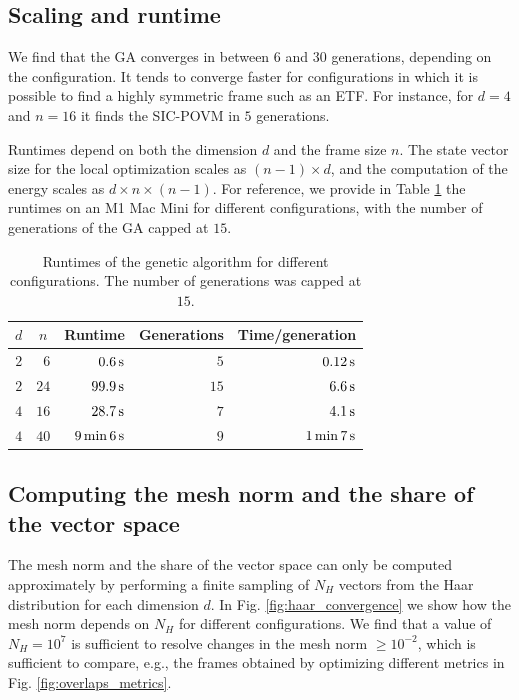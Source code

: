 \documentclass[%
superscriptaddress,
amsmath,amssymb,
 aps,
pra,
floatfix,
]{revtex4-2}
\begin{document}
\subsection{Scaling and runtime}
We find that the GA converges in between $6$ and $30$ generations, depending on the configuration. It tends to converge faster for configurations in which it is possible to find a highly symmetric frame such as an ETF. For instance, for $d=4$ and $n=16$ it finds the SIC-POVM in $5$ generations. 

Runtimes depend on both the dimension $d$ and the frame size $n$. The state vector size for the local optimization scales as $(n-1) \times d$, and the computation of the energy scales as $d \times n \times (n-1)$. For reference, we provide in Table \ref{tab:runtimes} the runtimes on an M1 Mac Mini for different configurations, with the number of generations of the GA capped at $15$.
\begin{table}[]
\begin{tabular}{@{}rrrrr@{}}
\toprule
\multicolumn{1}{c}{$d$} & \multicolumn{1}{c}{$n$} & \multicolumn{1}{c}{Runtime}   & \multicolumn{1}{c}{Generations} & \multicolumn{1}{c}{Time/generation} \\ \midrule
$2$                     & $6$                     & $0.6 \, {\rm s}$              & $5$                                               & $0.12 \, {\rm s}$                   \\
$2$                     & $24$                    & $99.9 \, {\rm s}$             & $15$                                              & $6.6 \, {\rm s}$                    \\
$4$                     & $16$                    & $28.7 \, {\rm s}$             & $7$                                               & $4.1 \, {\rm s}$                    \\
$4$                     & $40$                    & $9 \, {\rm min} \, 6 \, {\rm s}$ & $9$                                               & $1 \, {\rm min} \, 7 \, {\rm s}$       \\ \bottomrule
\end{tabular}
\label{tab:runtimes}
\caption{Runtimes of the genetic algorithm for different configurations. The number of generations was capped at $15$.}
\end{table}

\subsection{Computing the mesh norm and the share of the vector space}
The mesh norm and the share of the vector space can only be computed approximately by performing a finite sampling of $N_H$ vectors from the Haar distribution for each dimension $d$. 
In Fig. \ref{fig:haar_convergence} we show how the mesh norm depends on $N_H$ for different configurations.  
We find that a value of $N_H = 10^7$ is sufficient to resolve changes in the mesh norm $\geq 10^{-2}$, which is sufficient to compare, e.g., the frames obtained by optimizing different metrics in Fig. \ref{fig:overlaps_metrics}.
\end{document}
